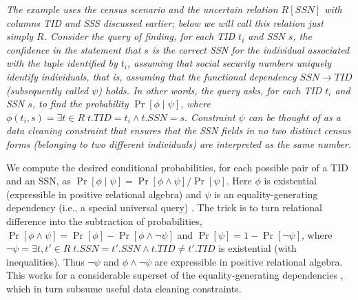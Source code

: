 \begin{example}\em
\label{ex:trick}
%
The example uses the census scenario and the uncertain relation $R[SSN]$
with columns TID and SSS discussed earlier; below we will call this relation
just simply $R$.
Consider the query of finding, for each TID $t_i$ and SSN $s$, the confidence in the statement that $s$ is the correct SSN for the individual associated with the tuple identified by $t_i$, assuming
that social security numbers uniquely identify individuals, that is, assuming that the functional dependency
$SSN \rightarrow TID$ (subsequently called $\psi$) holds.
In other words, the query asks, for each TID $t_i$ and SSN $s$, to find the probability $\Pr[\phi \mid \psi]$, where
$
\phi(t_i,s) = \exists t \in R\; t.TID=t_i \land t.SSN=s.
$
%
Constraint $\psi$ can be thought of as a data cleaning constraint that ensures that the SSN fields in no two distinct census forms (belonging to two different individuals) are interpreted as the same number. 

We compute the desired conditional probabilities, for each possible pair of a TID and an SSN, as
$
\Pr[\phi \mid \psi] = \Pr[\phi \land \psi] / \Pr[\psi].
$
Here $\phi$ is existential (expressible in positive relational algebra) and $\psi$ is an equality-generating dependency (i.e., a special universal query) \cite{AHV95}.
%
The trick is to turn relational difference into the subtraction of probabilities,
$\Pr[\phi \land \psi] = \Pr[\phi] - \Pr[\phi \land \neg \psi]$ and
$\Pr[\psi] = 1 - \Pr[\neg \psi]$, where
$
\neg \psi = \exists t,t' \in R \; t.SSN = t'.SSN \land t.TID \neq t'.TID
$
is existential (with inequalities). Thus $\neg \psi$ and $\phi \land \neg \psi$ are
expressible in positive relational algebra. This works for a considerable superset of the equality-generating dependencies \cite{Koch2008}, which in turn subsume useful data cleaning constraints.


\end{example}
